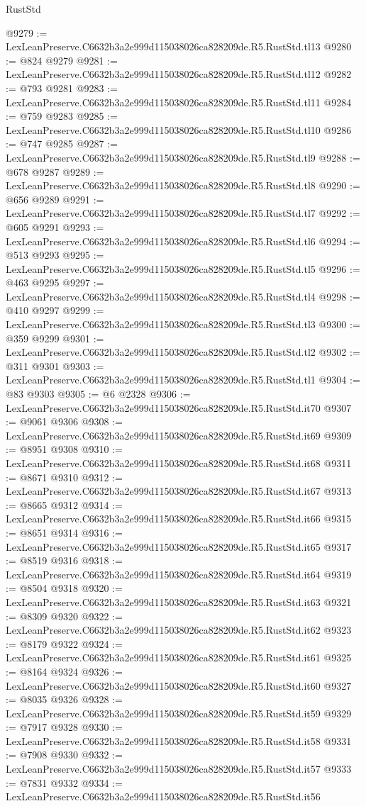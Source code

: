 \begin{lexlean}{RustStd}
\begin{coremodule}
@9279 := LexLeanPreserve.C6632b3a2e999d115038026ca828209de.R5.RustStd.tl13
@9280 := @824 @9279
@9281 := LexLeanPreserve.C6632b3a2e999d115038026ca828209de.R5.RustStd.tl12
@9282 := @793 @9281
@9283 := LexLeanPreserve.C6632b3a2e999d115038026ca828209de.R5.RustStd.tl11
@9284 := @759 @9283
@9285 := LexLeanPreserve.C6632b3a2e999d115038026ca828209de.R5.RustStd.tl10
@9286 := @747 @9285
@9287 := LexLeanPreserve.C6632b3a2e999d115038026ca828209de.R5.RustStd.tl9
@9288 := @678 @9287
@9289 := LexLeanPreserve.C6632b3a2e999d115038026ca828209de.R5.RustStd.tl8
@9290 := @656 @9289
@9291 := LexLeanPreserve.C6632b3a2e999d115038026ca828209de.R5.RustStd.tl7
@9292 := @605 @9291
@9293 := LexLeanPreserve.C6632b3a2e999d115038026ca828209de.R5.RustStd.tl6
@9294 := @513 @9293
@9295 := LexLeanPreserve.C6632b3a2e999d115038026ca828209de.R5.RustStd.tl5
@9296 := @463 @9295
@9297 := LexLeanPreserve.C6632b3a2e999d115038026ca828209de.R5.RustStd.tl4
@9298 := @410 @9297
@9299 := LexLeanPreserve.C6632b3a2e999d115038026ca828209de.R5.RustStd.tl3
@9300 := @359 @9299
@9301 := LexLeanPreserve.C6632b3a2e999d115038026ca828209de.R5.RustStd.tl2
@9302 := @311 @9301
@9303 := LexLeanPreserve.C6632b3a2e999d115038026ca828209de.R5.RustStd.tl1
@9304 := @83 @9303
@9305 := @6 @2328
@9306 := LexLeanPreserve.C6632b3a2e999d115038026ca828209de.R5.RustStd.it70
@9307 := @9061 @9306
@9308 := LexLeanPreserve.C6632b3a2e999d115038026ca828209de.R5.RustStd.it69
@9309 := @8951 @9308
@9310 := LexLeanPreserve.C6632b3a2e999d115038026ca828209de.R5.RustStd.it68
@9311 := @8671 @9310
@9312 := LexLeanPreserve.C6632b3a2e999d115038026ca828209de.R5.RustStd.it67
@9313 := @8665 @9312
@9314 := LexLeanPreserve.C6632b3a2e999d115038026ca828209de.R5.RustStd.it66
@9315 := @8651 @9314
@9316 := LexLeanPreserve.C6632b3a2e999d115038026ca828209de.R5.RustStd.it65
@9317 := @8519 @9316
@9318 := LexLeanPreserve.C6632b3a2e999d115038026ca828209de.R5.RustStd.it64
@9319 := @8504 @9318
@9320 := LexLeanPreserve.C6632b3a2e999d115038026ca828209de.R5.RustStd.it63
@9321 := @8309 @9320
@9322 := LexLeanPreserve.C6632b3a2e999d115038026ca828209de.R5.RustStd.it62
@9323 := @8179 @9322
@9324 := LexLeanPreserve.C6632b3a2e999d115038026ca828209de.R5.RustStd.it61
@9325 := @8164 @9324
@9326 := LexLeanPreserve.C6632b3a2e999d115038026ca828209de.R5.RustStd.it60
@9327 := @8035 @9326
@9328 := LexLeanPreserve.C6632b3a2e999d115038026ca828209de.R5.RustStd.it59
@9329 := @7917 @9328
@9330 := LexLeanPreserve.C6632b3a2e999d115038026ca828209de.R5.RustStd.it58
@9331 := @7908 @9330
@9332 := LexLeanPreserve.C6632b3a2e999d115038026ca828209de.R5.RustStd.it57
@9333 := @7831 @9332
@9334 := LexLeanPreserve.C6632b3a2e999d115038026ca828209de.R5.RustStd.it56

\end{coremodule}
\end{lexlean}
